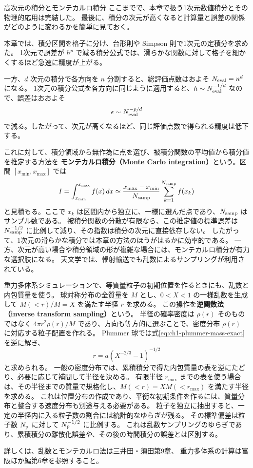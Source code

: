 \begin{topicblock}{高次元の積分とモンテカルロ積分}
ここまでで、本章で扱う1次元数値積分とその物理的応用は完結した。
最後に、積分の次元が高くなると計算量と誤差の関係がどのように変わるかを簡単に見ておく。

本章では、積分区間を格子に分け、台形則や Simpson 則で1次元の定積分を求めた。
1次元で誤差が $h^p$ で減る積分公式では、滑らかな関数に対して格子を細かくするほど急速に精度が上がる。

一方、$d$ 次元の積分で各方向を $n$ 分割すると、総評価点数はおよそ $N_{\rm eval}=n^d$ になる。
1次元の積分公式を各方向に同じように適用すると、$h\sim N_{\rm eval}^{-1/d}$ なので、誤差はおおよそ
\[
 \epsilon\sim N_{\rm eval}^{-p/d}
\]
で減る。したがって、次元が高くなるほど、同じ評価点数で得られる精度は低下する。

これに対して、積分領域から無作為に点を選び、被積分関数の平均値から積分値を推定する方法を
\textbf{モンテカルロ積分（Monte Carlo integration）}という。区間 $[x_{\min},x_{\max}]$ では
\[
 I=\int_{x_{\min}}^{x_{\max}} f(x)\,dx
 \simeq
 \frac{x_{\max}-x_{\min}}{N_{\rm samp}}\sum_{k=1}^{N_{\rm samp}}f(x_k)
\]
と見積もる。ここで $x_k$ は区間内から独立に、一様に選んだ点であり、$N_{\rm samp}$ はサンプル数である。
被積分関数の分散が有限なら、この推定値の標準誤差は $N_{\rm samp}^{-1/2}$ に比例して減り、その指数は積分の次元に直接依存しない。
したがって、1次元の滑らかな積分では本章の方法のほうがはるかに効率的である。
一方、次元が高い場合や積分領域の形が複雑な場合には、モンテカルロ積分が有力な選択肢になる。
天文学では、輻射輸送でも乱数によるサンプリングが利用されている\cite{matsumoto}。

重力多体系シミュレーションで、等質量粒子の初期位置を作るときにも、乱数と内包質量を使う。
球対称分布の全質量を $M$ とし、$0<X<1$ の一様乱数を生成して $M(<r)/M=X$ を満たす半径 $r$ を求める。
この操作を\textbf{逆関数法（inverse transform sampling）}という。
半径の確率密度は $\rho(r)$ そのものではなく $4\pi r^2\rho(r)/M$ であり、方向も等方的に選ぶことで、密度分布 $\rho(r)$ に対応する粒子配置を作れる。
Plummer 球では式\eqref{eq:ch1-plummer-mass-exact}を逆に解き、
\[
 r=a\left(X^{-2/3}-1\right)^{-1/2}
\]
と求められる。
一般の密度分布では、累積積分で得た内包質量の表を逆にたどり、必要に応じて補間して半径を決める。
有限半径 $r_{\max}$ までの表を使う場合は、その半径までの質量で規格化し、$M(<r)=X M(<r_{\max})$ を満たす半径を求める。
これは位置分布の作成であり、平衡な初期条件を作るには、質量分布と整合する速度分布も別途与える必要がある。
粒子を独立に抽出すると、一定の半径内に入る粒子数の割合には統計的なゆらぎが残る。
その標準偏差は粒子数 $N_{\rm p}$ に対して $N_{\rm p}^{-1/2}$ に比例する。
これは乱数サンプリングのゆらぎであり、累積積分の離散化誤差や、その後の時間積分の誤差とは区別する。

詳しくは、乱数とモンテカルロ法は三井田・須田\cite{miida2023}第9章、
重力多体系の計算は富阪ほか編\cite{tomisaka2007}第6章を参照すること。
\end{topicblock}

